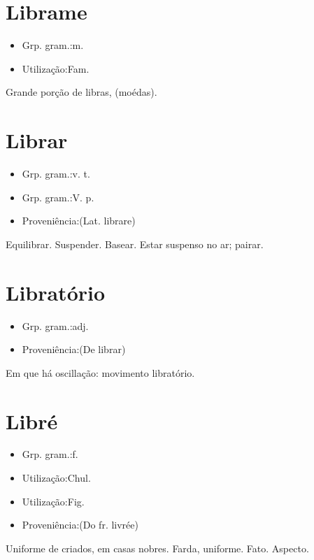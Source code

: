 \section{Librame}
\begin{itemize}
\item {Grp. gram.:m.}
\end{itemize}
\begin{itemize}
\item {Utilização:Fam.}
\end{itemize}
Grande porção de libras, (moédas).
\section{Librar}
\begin{itemize}
\item {Grp. gram.:v. t.}
\end{itemize}
\begin{itemize}
\item {Grp. gram.:V. p.}
\end{itemize}
\begin{itemize}
\item {Proveniência:(Lat. \textunderscore librare\textunderscore )}
\end{itemize}
Equilibrar.
Suspender.
Basear.
Estar suspenso no ar; pairar.
\section{Libratório}
\begin{itemize}
\item {Grp. gram.:adj.}
\end{itemize}
\begin{itemize}
\item {Proveniência:(De \textunderscore librar\textunderscore )}
\end{itemize}
Em que há oscillação: \textunderscore movimento libratório\textunderscore .
\section{Libré}
\begin{itemize}
\item {Grp. gram.:f.}
\end{itemize}
\begin{itemize}
\item {Utilização:Chul.}
\end{itemize}
\begin{itemize}
\item {Utilização:Fig.}
\end{itemize}
\begin{itemize}
\item {Proveniência:(Do fr. \textunderscore livrée\textunderscore )}
\end{itemize}
Uniforme de criados, em casas nobres.
Farda, uniforme.
Fato.
Aspecto.
